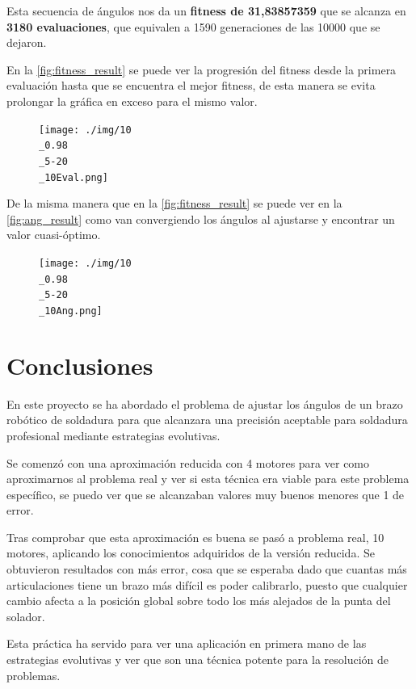 \documentclass[12pt, spanish, pdftex]{UC3M_document}
\begin{document}
Esta secuencia de ángulos nos da un \textbf{fitness de 31,83857359} que se alcanza en \textbf{3180 evaluaciones}, que equivalen a 1590 generaciones de las 10000 que se dejaron. 

En la \autoref{fig:fitness_result} se puede ver la progresión del fitness desde la primera evaluación hasta que se encuentra el mejor fitness, de esta manera se evita prolongar la gráfica en exceso para el mismo valor.

\begin{figure}[H]
	{\texttt{[image: ./img/10\\\_0.98\\\_5-20\\\_10Eval.png]}}
\end{figure}
\pagebreak

De la misma manera que en la \autoref{fig:fitness_result} se puede ver en la \autoref{fig:ang_result} como van convergiendo los ángulos al ajustarse y encontrar un valor cuasi-óptimo.
\begin{figure}[H]
	{\texttt{[image: ./img/10\\\_0.98\\\_5-20\\\_10Ang.png]}}
\end{figure}

\section{Conclusiones}
En este proyecto se ha abordado el problema de ajustar los ángulos de un brazo robótico de soldadura para que alcanzara una precisión aceptable para soldadura profesional mediante estrategias evolutivas. 

Se comenzó con una aproximación reducida con 4 motores para ver como aproximarnos al problema real y ver si esta técnica era viable para este problema específico, se puedo ver que se alcanzaban valores muy buenos menores que 1 de error.

Tras comprobar que esta aproximación es buena se pasó a problema real, 10 motores, aplicando los conocimientos adquiridos de la versión reducida. Se obtuvieron resultados con más error, cosa que se esperaba dado que cuantas más articulaciones tiene un brazo más difícil es poder calibrarlo, puesto que cualquier cambio afecta a la posición global sobre todo los más alejados de la punta del solador.

Esta práctica ha servido para ver una aplicación en primera mano de las estrategias evolutivas y ver que son una técnica potente para la resolución de problemas.
\end{document}
